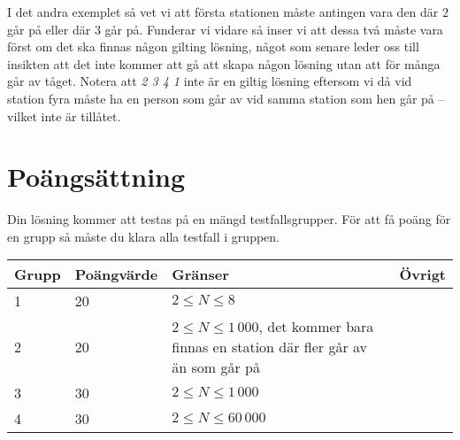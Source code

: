 I det andra exemplet så vet vi att första stationen måste antingen vara den där $2$ går på eller där $3$
går på. Funderar vi vidare så inser vi att dessa två måste vara först om det ska finnas någon gilting lösning,
något som senare leder oss till insikten att det inte kommer att gå att skapa någon lösning utan att för många
går av tåget. Notera att \emph{2 3 4 1} inte är en giltig lösning eftersom vi då vid station fyra måste ha en person
som går av vid samma station som hen går på -- vilket inte är tillåtet.

\section*{Poängsättning}
Din lösning kommer att testas på en mängd testfallsgrupper. För att få poäng för en grupp så måste du klara alla testfall i gruppen.

\begin{tabular}{| l | l | l | l |}
\hline
Grupp & Poängvärde & Gränser & Övrigt\\ \hline
1     & 20         & $ 2 \le N \le 8 $ & \\ \hline
2     & 20         & $ 2 \le N \le 1\,000 $, det kommer bara finnas en station där fler går av än som går på & \\ \hline
3     & 30         & $ 2 \le N \le 1\,000 $ & \\ \hline
4     & 30         & $ 2 \le N \le 60\,000 $ & \\ \hline
\end{tabular}
